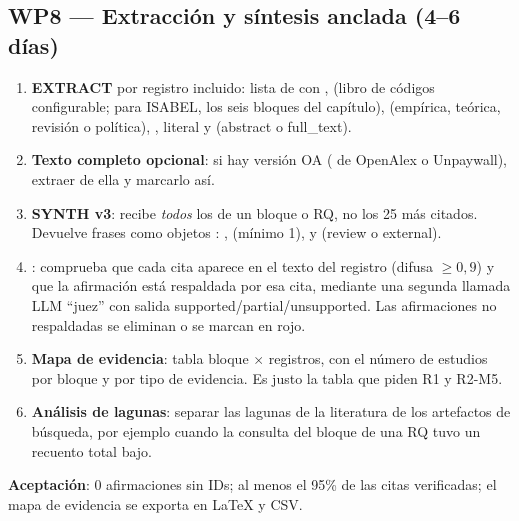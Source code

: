 \documentclass[11pt,a4paper]{article}
\newcommand{\WP}[1]{\textbf{\textcolor{palet}{WP#1}}}
\begin{document}
\subsection*{\WP{8} — Extracción y síntesis anclada (4--6 días)}
\begin{enumerate}
  \item \textbf{EXTRACT} por registro incluido: lista de  con ,  (libro de códigos configurable; para ISABEL, los seis bloques del capítulo),  (empírica, teórica, revisión o política), ,  literal y  (abstract o full\_text).
  \item \textbf{Texto completo opcional}: si hay versión OA ( de OpenAlex o Unpaywall), extraer de ella y marcarlo así.
  \item \textbf{SYNTH v3}: recibe \emph{todos} los  de un bloque o RQ, no los 25 más citados. Devuelve frases como objetos : ,  (mínimo 1),  y  (review o external).
  \item \textbf{}: comprueba que cada cita aparece en el texto del registro (difusa $\ge 0{,}9$) y que la afirmación está respaldada por esa cita, mediante una segunda llamada LLM ``juez'' con salida supported/partial/unsupported. Las afirmaciones no respaldadas se eliminan o se marcan en rojo.
  \item \textbf{Mapa de evidencia}: tabla bloque $\times$ registros, con el número de estudios por bloque y por tipo de evidencia. Es justo la tabla que piden R1 y R2-M5.
  \item \textbf{Análisis de lagunas}: separar las lagunas de la literatura de los artefactos de búsqueda, por ejemplo cuando la consulta del bloque de una RQ tuvo un recuento total bajo.
\end{enumerate}
\textbf{Aceptación}: 0 afirmaciones sin IDs; al menos el 95\% de las citas verificadas; el mapa de evidencia se exporta en LaTeX y CSV.

\end{document}
